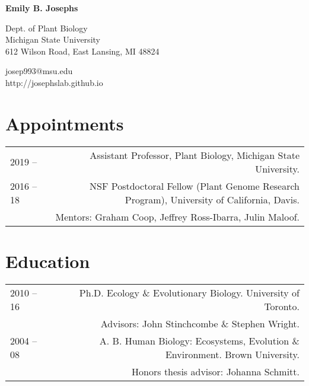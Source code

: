 \documentclass[letterpaper]{article}
\def\name{Emily B. Josephs}
\begin{document}
{\huge\textbf{\name}}
\vspace{0.1in}

\begin{minipage}{0.55\linewidth}
Dept. of Plant Biology\\
Michigan State University\\
612 Wilson Road, East Lansing, MI 48824\\
\end{minipage}
\begin{minipage}{0.35\textwidth}
josep993@msu.edu\\
http://josephslab.github.io \\

\end{minipage}
\section*{Appointments}
\begin{tabular}{LR}
 2019 --   & Assistant Professor, Plant Biology, Michigan State University. \\[0.5ex]
  2016 -- 18     & NSF Postdoctoral Fellow (Plant Genome Research Program), University of California, Davis.\\
  & Mentors: Graham Coop, Jeffrey Ross-Ibarra, Julin Maloof.\\ [0.5ex]
\end{tabular}


\section*{Education}
\begin{tabular}{LR}
2010 -- 16 & Ph.D. Ecology \& Evolutionary Biology. University of Toronto. \\ 
 & Advisors: John Stinchcombe \& Stephen Wright. \\ [0.5ex]
2004 -- 08 & A. B. Human Biology: Ecosystems, Evolution \& Environment. Brown University. \\
& Honors thesis advisor: Johanna Schmitt.
\end{tabular}
\end{document}
